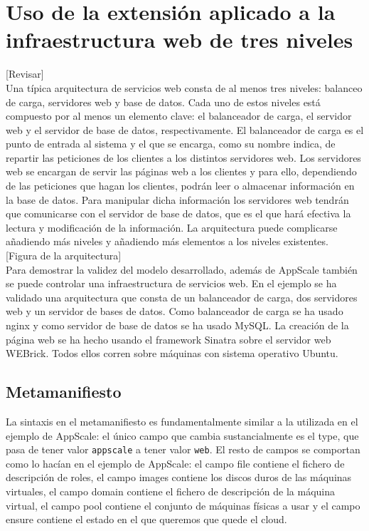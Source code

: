 \chapter{Uso de la extensión aplicado a la infraestructura web de tres niveles}
\label{cap:web}

[Revisar]\\

Una típica arquitectura de servicios web consta de al menos tres niveles: balanceo de carga, servidores web y base de datos. Cada uno de estos niveles está compuesto por al menos un elemento clave: el balanceador de carga, el servidor web y el servidor de base de datos, respectivamente. El balanceador de carga es el punto de entrada al sistema y el que se encarga, como su nombre indica, de repartir las peticiones de los clientes a los distintos servidores web. Los servidores web se encargan de servir las páginas web a los clientes y para ello, dependiendo de las peticiones que hagan los clientes, podrán leer o almacenar información en la base de datos. Para manipular dicha información los servidores web tendrán que comunicarse con el servidor de base de datos, que es el que hará efectiva la lectura y modificación de la información. La arquitectura puede complicarse añadiendo más niveles y añadiendo más elementos a los niveles existentes.\\

[Figura de la arquitectura]\\

Para demostrar la validez del modelo desarrollado, además de AppScale también se puede controlar una infraestructura de servicios web. En el ejemplo se ha validado una arquitectura que consta de un balanceador de carga, dos servidores web y un servidor de bases de datos. Como balanceador de carga se ha usado nginx y como servidor de base de datos se ha usado MySQL. La creación de la página web se ha hecho usando el framework Sinatra sobre el servidor web WEBrick. Todos ellos corren sobre máquinas con sistema operativo Ubuntu.\\

\section{Metamanifiesto}

La sintaxis en el metamanifiesto es fundamentalmente similar a la utilizada en el ejemplo de AppScale: el único campo que cambia sustancialmente es el type, que pasa de tener valor \texttt{appscale} a tener valor \texttt{web}. El resto de campos se comportan como lo hacían en el ejemplo de AppScale: el campo file contiene el fichero de descripción de roles, el campo images contiene los discos duros de las máquinas virtuales, el campo domain contiene el fichero de descripción de la máquina virtual, el campo pool contiene el conjunto de máquinas físicas a usar y el campo ensure contiene el estado en el que queremos que quede el cloud.

